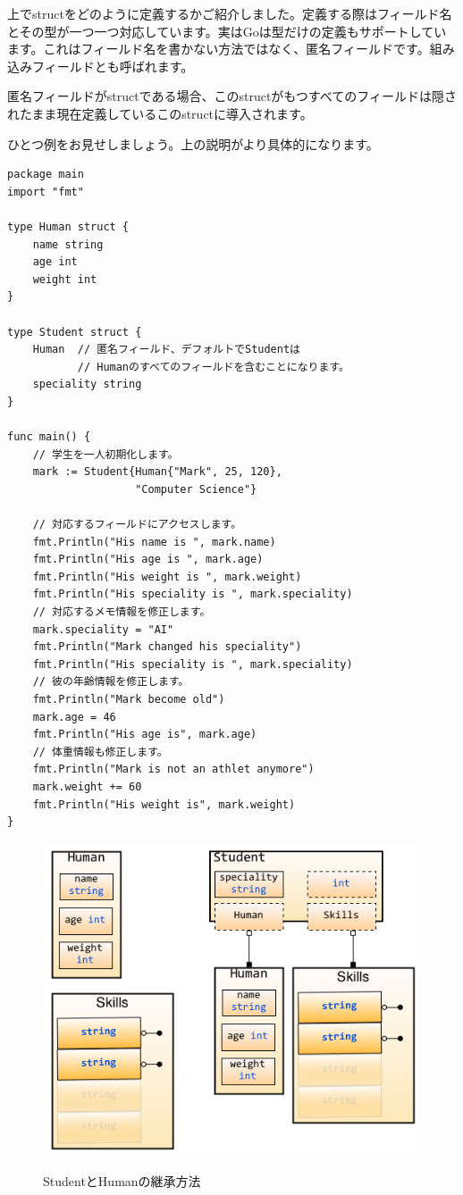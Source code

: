 上でstructをどのように定義するかご紹介しました。定義する際はフィールド名とその型が一つ一つ対応しています。実はGoは型だけの定義もサポートしています。これはフィールド名を書かない方法ではなく、匿名フィールドです。組み込みフィールドとも呼ばれます。

匿名フィールドがstructである場合、このstructがもつすべてのフィールドは隠されたまま現在定義しているこのstructに導入されます。

ひとつ例をお見せしましょう。上の説明がより具体的になります。

\begin{lstlisting}[numbers=none]
package main
import "fmt"

type Human struct {
    name string
    age int
    weight int
}

type Student struct {
    Human  // 匿名フィールド、デフォルトでStudentは
           // Humanのすべてのフィールドを含むことになります。
    speciality string
}

func main() {
    // 学生を一人初期化します。
    mark := Student{Human{"Mark", 25, 120},
                    "Computer Science"}

    // 対応するフィールドにアクセスします。
    fmt.Println("His name is ", mark.name)
    fmt.Println("His age is ", mark.age)
    fmt.Println("His weight is ", mark.weight)
    fmt.Println("His speciality is ", mark.speciality)
    // 対応するメモ情報を修正します。
    mark.speciality = "AI"
    fmt.Println("Mark changed his speciality")
    fmt.Println("His speciality is ", mark.speciality)
    // 彼の年齢情報を修正します。
    fmt.Println("Mark become old")
    mark.age = 46
    fmt.Println("His age is", mark.age)
    // 体重情報も修正します。
    fmt.Println("Mark is not an athlet anymore")
    mark.weight += 60
    fmt.Println("His weight is", mark.weight)
}
\end{lstlisting}

\begin{figure}[H]
  \includegraphics[width=14cm]{2.4.student_struct.png}
   \label{図2.7}
   \caption{StudentとHumanの継承方法}
\end{figure}

